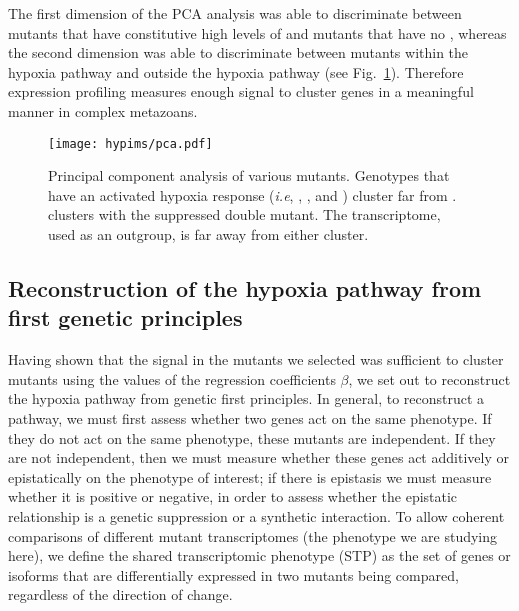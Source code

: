 The first dimension of the PCA analysis was able to discriminate between mutants
that have constitutive high levels of \hifp{} and mutants that have no \hifp{},
whereas the second dimension was able to discriminate between mutants within the
hypoxia pathway and outside the hypoxia pathway (see Fig.~\ref{fig:pca}).
Therefore expression profiling measures enough signal to cluster genes in a
meaningful manner in complex metazoans.

\begin{figure}[tbhp]
\centering
\texttt{[image: hypims/pca.pdf]}
\caption{
Principal component analysis of various \cel{} mutants. Genotypes that have an
activated hypoxia response (\emph{i.e}, \egl{}, \vhl{}, and \rhy{}) cluster far
from \hif{}. \hif{} clusters with the suppressed \eglhif{} double mutant.
The \fog{} transcriptome, used as an outgroup, is far away from either cluster.
}
\label{fig:pca}
\end{figure}

\subsection*{Reconstruction of the hypoxia pathway from first genetic principles}
\label{sec:reconstruct}
Having shown that the signal in the mutants we selected was sufficient to
cluster mutants using the values of the regression coefficients $\beta$, we set
out to reconstruct the hypoxia pathway from genetic first principles. In general,
to reconstruct a pathway, we must first assess whether two genes act on the same
phenotype.
If they do not act on the same phenotype, these mutants are independent. If they
are not independent, then we must measure whether these genes act additively or
epistatically on the phenotype of interest; if there is epistasis we must measure
whether it is positive or negative, in order to assess whether the epistatic
relationship is a genetic suppression or a synthetic interaction.
To allow coherent comparisons of different mutant transcriptomes (the phenotype
we are studying here), we define the
shared transcriptomic phenotype (STP) as the set of genes or isoforms that are
differentially expressed in two mutants being compared, regardless of the direction
of change.


